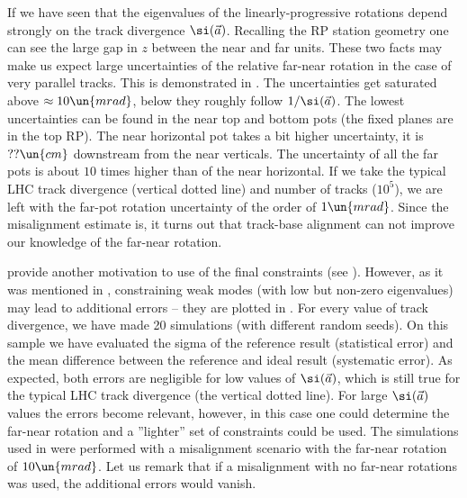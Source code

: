 If  we have seen that the eigenvalues of the linearly-progressive rotations depend strongly on the track divergence $\si(\vec a)$. Recalling the RP station geometry  one can see the large gap in $z$ between the near and far units. These two facts may make us expect large uncertainties of the relative far-near rotation in the case of very parallel tracks. This is demonstrated in . The uncertainties get saturated above $\approx 10\un{mrad}$, below they roughly follow $1/\si(\vec a)$. The lowest uncertainties can be found in the near top and bottom pots (the fixed planes are in the top RP). The near horizontal pot takes a bit higher uncertainty, it is $??\un{cm}$ downstream from the near verticals. The uncertainty of all the far pots is about $10$ times higher than of the near horizontal. If we take the typical LHC track divergence (vertical dotted line) and number of tracks ($10^5$), we are left with the far-pot rotation uncertainty of the order of $1\un{mrad}$. Since the misalignment estimate is, it turns out that track-base alignment can not improve our knowledge of the far-near rotation.


 provide another motivation to use of the final constraints (see ). However, as it was mentioned in , constraining weak modes (with low but non-zero eigenvalues) may lead to additional errors -- they are plotted in . For every value of track divergence, we have made 20 simulations (with different random seeds). On this sample we have evaluated the sigma of the reference result (statistical error) and the mean difference between the reference and ideal result (systematic error). As expected, both errors are negligible for low values of $\si(\vec a)$, which is still true for the typical LHC track divergence (the vertical dotted line). For large $\si(\vec a)$ values the errors become relevant, however, in this case one could determine the far-near rotation and a ''lighter'' set of constraints could be used. The simulations used in  were performed with a misalignment scenario with the far-near rotation of $10\un{mrad}$. Let us remark that if a misalignment with no far-near rotations was used, the additional errors would vanish.


